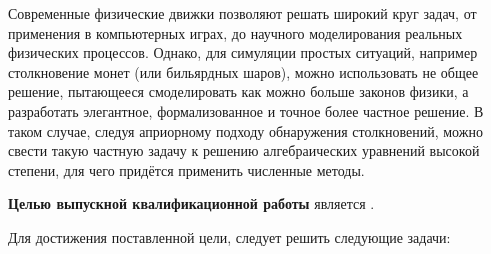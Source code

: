 
Современные физические движки позволяют решать широкий круг задач,
от применения в компьютерных играх, до научного моделирования реальных физических процессов.
Однако, для симуляции простых ситуаций, например столкновение монет (или бильярдных шаров),
можно использовать не общее решение, пытающееся смоделировать как можно больше законов физики,
а разработать элегантное, формализованное и точное более частное решение.
В таком случае, следуя априорному подходу обнаружения столкновений,
можно свести такую частную задачу к решению алгебраических уравнений высокой степени,
для чего придётся применить численные методы.

\textbf{Целью выпускной квалификационной работы} является \Target.

Для достижения поставленной цели, следует решить следующие задачи:

\Tasks

\clearpage
